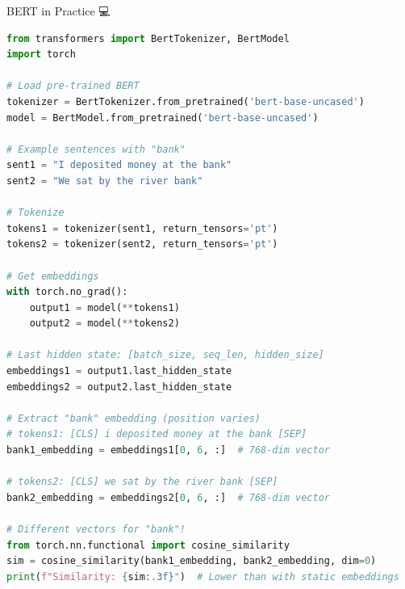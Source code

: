 \documentclass[aspectratio=169]{beamer}
\begin{document}
\begin{frame}[fragile]{BERT in Practice 💻}
\begin{lstlisting}[language=Python]
from transformers import BertTokenizer, BertModel
import torch

# Load pre-trained BERT
tokenizer = BertTokenizer.from_pretrained('bert-base-uncased')
model = BertModel.from_pretrained('bert-base-uncased')

# Example sentences with "bank"
sent1 = "I deposited money at the bank"
sent2 = "We sat by the river bank"

# Tokenize
tokens1 = tokenizer(sent1, return_tensors='pt')
tokens2 = tokenizer(sent2, return_tensors='pt')

# Get embeddings
with torch.no_grad():
    output1 = model(**tokens1)
    output2 = model(**tokens2)

# Last hidden state: [batch_size, seq_len, hidden_size]
embeddings1 = output1.last_hidden_state
embeddings2 = output2.last_hidden_state

# Extract "bank" embedding (position varies)
# tokens1: [CLS] i deposited money at the bank [SEP]
bank1_embedding = embeddings1[0, 6, :]  # 768-dim vector

# tokens2: [CLS] we sat by the river bank [SEP]
bank2_embedding = embeddings2[0, 6, :]  # 768-dim vector

# Different vectors for "bank"!
from torch.nn.functional import cosine_similarity
sim = cosine_similarity(bank1_embedding, bank2_embedding, dim=0)
print(f"Similarity: {sim:.3f}")  # Lower than with static embeddings
\end{lstlisting}
\end{frame}
\end{document}
